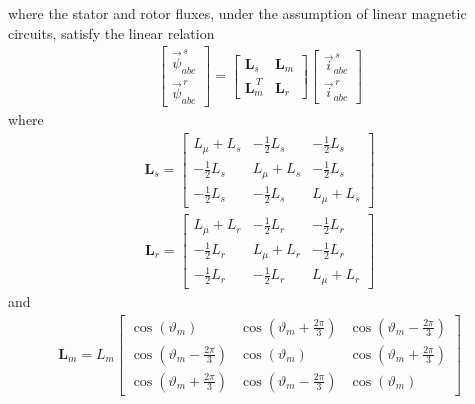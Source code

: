 \documentclass[11pt,a4paper,oneside]{book}
\numberwithin{equation}{section}
\theoremstyle{it}
\theoremstyle{definition}
\begin{document}
where the stator and rotor fluxes, under the assumption of linear magnetic 
circuits, satisfy the linear relation
\begin{equation}\label{im_eq_5}
	\begin{aligned}
		\begin{bmatrix} \vec{\psi}^{\,s}_{abc} \\[6pt] \vec{\psi}^{\,r}_{abc} 
		\end{bmatrix} = \begin{bmatrix} \mathbf{L}_s & \mathbf{L}_{m} \\[6pt] 
			\mathbf{L}_{m}^{\,T} & \mathbf{L}_{r} \end{bmatrix}\begin{bmatrix} 
			\vec{i}^{\,s}_{abc} \\[6pt] \vec{i}^{\,r}_{abc} \end{bmatrix}
	\end{aligned}
\end{equation}
where
\begin{equation}\label{im_eq_6}
	\begin{aligned}
		\mathbf{L}_s = \begin{bmatrix} L_\mu+L_s & -\frac{1}{2}L_s & 
			-\frac{1}{2}L_s \\[6pt] -\frac{1}{2}L_s & L_\mu+L_s & 
			-\frac{1}{2}L_s 
			\\[6pt] -\frac{1}{2}L_s & -\frac{1}{2}L_s & L_\mu+L_s \end{bmatrix}
	\end{aligned}
\end{equation}
\begin{equation}\label{im_eq_7}
	\begin{aligned}
		\mathbf{L}_r = \begin{bmatrix} L_\mu+L_r & -\frac{1}{2}L_r & 
			-\frac{1}{2}L_r \\[6pt] -\frac{1}{2}L_r & L_\mu+L_r & 
			-\frac{1}{2}L_r 
			\\[6pt] -\frac{1}{2}L_r & -\frac{1}{2}L_r & L_\mu+L_r \end{bmatrix}
	\end{aligned}
\end{equation}
and
\begin{equation}\label{im_eq_8}
	\begin{aligned}
		\mathbf{L}_m = L_m\begin{bmatrix} \cos(\vartheta_{m}) & 
			\cos(\vartheta_{m}+\frac{2\pi}{3}) & 
			\cos(\vartheta_{m}-\frac{2\pi}{3}) 
			\\[6pt] \cos(\vartheta_{m}-\frac{2\pi}{3}) & \cos(\vartheta_{m}) & 
			\cos(\vartheta_{m}+\frac{2\pi}{3}) \\[6pt] 
			\cos(\vartheta_{m}+\frac{2\pi}{3}) & 
			\cos(\vartheta_{m}-\frac{2\pi}{3}) 
			& \cos(\vartheta_{m}) \end{bmatrix}
	\end{aligned}
\end{equation}
\end{document}
